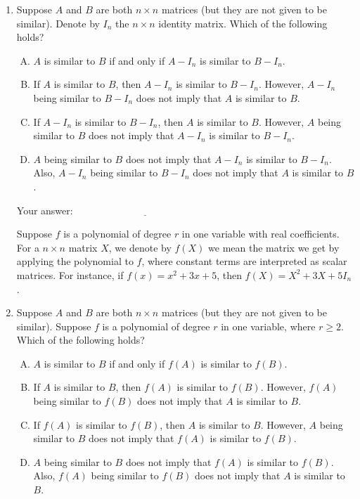 \documentclass[10pt]{amsart}
\begin{document}
\begin{enumerate}

\item Suppose $A$ and $B$ are both $n \times n$ matrices (but they are
  not given to be similar). Denote by $I_n$ the $n \times n$ identity
  matrix. Which of the following holds?

  \begin{enumerate}[(A)]
  \item $A$ is similar to $B$ if and only if $A - I_n$ is similar to
    $B - I_n$.
  \item If $A$ is similar to $B$, then $A - I_n$ is similar to $B -
    I_n$. However, $A - I_n$ being similar to $B - I_n$ does not imply
    that $A$ is similar to $B$.
  \item If $A - I_n$ is similar to $B - I_n$, then $A$ is similar to
    $B$. However, $A$ being similar to $B$ does not imply that $A -
    I_n$ is similar to $B - I_n$.
  \item $A$ being similar to $B$ does not imply that $A - I_n$ is
    similar to $B - I_n$. Also, $A - I_n$ being similar to $B - I_n$
    does not imply that $A$ is similar to $B$.
  \end{enumerate}

  \vspace{0.1in}
  Your answer: $\underline{\qquad\qquad\qquad\qquad\qquad\qquad\qquad}$
  \vspace{0.6in}

  Suppose $f$ is a polynomial of degree $r$ in one variable with real
  coefficients. For a $n \times n$ matrix $X$, we denote by $f(X)$ we
  mean the matrix we get by applying the polynomial to $f$, where
  constant terms are interpreted as scalar matrices. For instance, if
  $f(x) = x^2 + 3x + 5$, then $f(X) = X^2 + 3X + 5I_n$.

\item Suppose $A$ and $B$ are both $n \times n$ matrices (but they are
  not given to be similar). Suppose $f$ is a polynomial of degree $r$
  in one variable, where $r \ge 2$. Which of the following holds?

  \begin{enumerate}[(A)]
  \item $A$ is similar to $B$ if and only if $f(A)$ is similar to
    $f(B)$.
  \item If $A$ is similar to $B$, then $f(A)$ is similar to
    $f(B)$. However, $f(A)$ being similar to $f(B)$ does not
    imply that $A$ is similar to $B$.
  \item If $f(A)$ is similar to $f(B)$, then $A$ is similar to
    $B$. However, $A$ being similar to $B$ does not imply that $f(A)$
    is similar to $f(B)$.
  \item $A$ being similar to $B$ does not imply that $f(A)$ is
    similar to $f(B)$. Also, $f(A)$ being similar to $f(B)$
    does not imply that $A$ is similar to $B$.
  \end{enumerate}


\end{enumerate}
\end{document}
